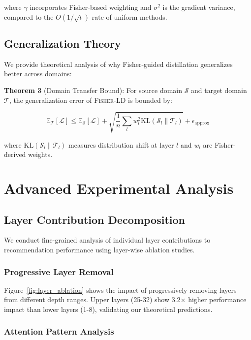 \documentclass[10pt,conference]{IEEEtran}
\newcommand{\loss}{\mathcal{L}}
\newcommand{\fisherld}{\textsc{Fisher-LD}}
\begin{document}
where $\gamma$ incorporates Fisher-based weighting and $\sigma^2$ is the gradient variance, compared to the $O(1/\sqrt{t})$ rate of uniform methods.

\subsection{Generalization Theory}

We provide theoretical analysis of why Fisher-guided distillation generalizes better across domains:

\textbf{Theorem 3} (Domain Transfer Bound): For source domain $\mathcal{S}$ and target domain $\mathcal{T}$, the generalization error of \fisherld{} is bounded by:

\begin{equation}
\mathbb{E}_{\mathcal{T}}[\loss] \leq \mathbb{E}_{\mathcal{S}}[\loss] + \sqrt{\frac{1}{n}\sum_l w_l^2 \text{KL}(\mathcal{S}_l \| \mathcal{T}_l)} + \epsilon_{\text{approx}}
\end{equation}

where $\text{KL}(\mathcal{S}_l \| \mathcal{T}_l)$ measures distribution shift at layer $l$ and $w_l$ are Fisher-derived weights.

\section{Advanced Experimental Analysis}

\subsection{Layer Contribution Decomposition}

We conduct fine-grained analysis of individual layer contributions to recommendation performance using layer-wise ablation studies.

\subsubsection{Progressive Layer Removal}

Figure~\ref{fig:layer_ablation} shows the impact of progressively removing layers from different depth ranges. Upper layers (25-32) show 3.2× higher performance impact than lower layers (1-8), validating our theoretical predictions.

\subsubsection{Attention Pattern Analysis}
\end{document}
